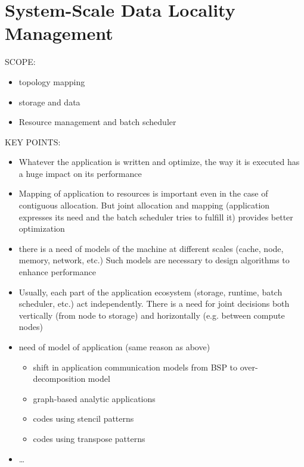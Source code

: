 \chapter{System-Scale Data Locality Management}
\label{ch:systemscale}







SCOPE:

\begin{itemize}
\item topology mapping
\item storage and data
\item Resource management and batch scheduler
\end{itemize}

KEY POINTS:
\begin{itemize}
\item Whatever the application is written and optimize, the way it is executed
  has a huge impact on its performance
 \item Mapping of application to resources is important even in the case of
   contiguous allocation. But joint allocation and mapping  (application
   expresses its need and the batch scheduler tries to fulfill it) provides
   better optimization
\item there is a need of models of the machine at different scales (cache, node,
memory, network, etc.) Such models are necessary to design algorithms to enhance
performance
  \item Usually, each part of the application ecosystem (storage, runtime, batch
    scheduler, etc.) act independently. There is a need for joint decisions both
    vertically (from node to storage) and horizontally (e.g. between compute
    nodes)
\item need of model of application (same reason as above)
\begin{itemize}
\item shift in application communication models from BSP to over-decomposition model
\item graph-based analytic applications
\item codes using stencil patterns
\item codes using transpose patterns
\end{itemize}
\item \ldots
\end{itemize}

